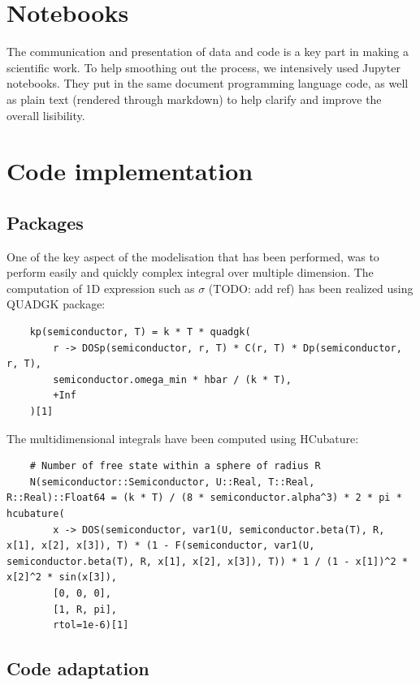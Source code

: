 \section{Notebooks}

The communication and presentation of data and code is a key part in making a scientific work. To help smoothing out the process, we intensively used Jupyter notebooks. They put in the same document programming language code, as well as plain text (rendered through markdown) to help clarify and improve the overall lisibility.

\section{Code implementation}

\subsection{Packages}

One of the key aspect of the modelisation that has been performed, was to perform easily and quickly complex integral over multiple dimension. The computation of 1D expression such as $\sigma$ (TODO: add ref) has been realized using QUADGK package:

\begin{lstlisting}
    kp(semiconductor, T) = k * T * quadgk(
        r -> DOSp(semiconductor, r, T) * C(r, T) * Dp(semiconductor, r, T),
        semiconductor.omega_min * hbar / (k * T),
        +Inf
    )[1]
\end{lstlisting}

The multidimensional integrals have been computed using HCubature:

\begin{lstlisting}
    # Number of free state within a sphere of radius R
    N(semiconductor::Semiconductor, U::Real, T::Real, R::Real)::Float64 = (k * T) / (8 * semiconductor.alpha^3) * 2 * pi * hcubature(
        x -> DOS(semiconductor, var1(U, semiconductor.beta(T), R, x[1], x[2], x[3]), T) * (1 - F(semiconductor, var1(U, semiconductor.beta(T), R, x[1], x[2], x[3]), T)) * 1 / (1 - x[1])^2 * x[2]^2 * sin(x[3]),
        [0, 0, 0],
        [1, R, pi],
        rtol=1e-6)[1]
\end{lstlisting}

\subsection{Code adaptation}

